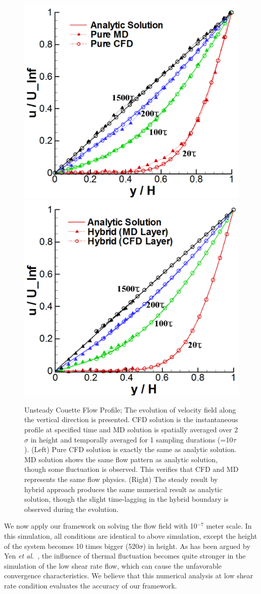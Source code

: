 \documentclass[preprint,12pt]{elsarticle}
\begin{document}
\begin{figure}
\centering
\includegraphics[width=0.6\linewidth]{Flat_Plate_Sol1_New.pdf}
\hskip 1cm
\includegraphics[width=0.6\linewidth]{Flat_Plate_Sol2_New.pdf}
\vskip-0.2cm
\caption{\small Unsteady Couette Flow Profile; The evolution of velocity field along the vertical direction is presented. CFD solution is the instantaneous profile at specified time and MD solution is spatially averaged over 2 $\sigma$ in height and temporally averaged for 1 sampling durations (=10$\tau$). (Left) Pure CFD solution is exactly the same as analytic solution. MD solution shows the same flow pattern as analytic solution, though some fluctuation is observed. This verifies that CFD and MD represents the same flow physics. (Right) The steady result by hybrid approach produces the same numerical result as analytic solution, though the slight time-lagging in the hybrid boundary is observed during the evolution.}
\label{Flat_Plate_Sol}
\end{figure}


We now apply our framework on solving the flow field with 10$^{-7}$ meter scale. In this simulation, all conditions are identical to above simulation, except the height of the system becomes 10 times bigger (520$\sigma$) in height. As has been argued by Yen {\it{et al.}}~\cite{Yen}, the influence of thermal fluctuation becomes quite stronger in the simulation of the low shear rate flow, which can cause the unfavorable convergence characteristics. We believe that this numerical analysis at low shear rate condition evaluates the accuracy of our framework.
\end{document}
